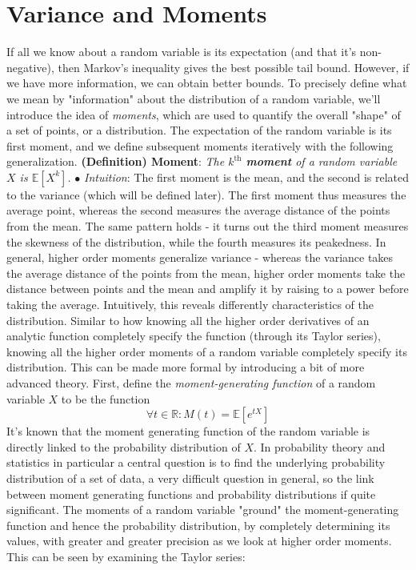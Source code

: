 \documentclass{article}
\newcommand*{\tb}{\textbf}
\newcommand*{\ti}{\textit}
\newcommand*{\n}{\newline}
\newcommand*{\nn}{\newline \newline}
\newcommand*{\In}{\indent \ensuremath{\bullet} \textit{Intuition}: }
\newcommand*{\R}{\mathbb{R}}
\newcommand*{\E}{\mathbb{E}}
\begin{document}
\section{Variance and Moments}
If all we know about a random variable is its expectation (and that it's non-negative), then Markov's inequality gives the best possible tail bound. However, if we have more information, we can obtain better bounds. To precisely define what we mean by "information" about the distribution of a random variable, we'll introduce the idea of \ti{moments}, which are used to quantify the overall "shape" of a set of points, or a distribution. The expectation of the random variable is its first moment, and we define subsequent moments iteratively with the following generalization.
\nn
\tb{(Definition) Moment}: \ti{The $ k^{\text{th}} $ \tb{moment} of a random variable $ X $ is $ \E[X^k] $.}
\n
\In The first moment is the mean, and the second is related to the variance (which will be defined later). The first moment thus measures the average point, whereas the second measures the average distance of the points from the mean. The same pattern holds - it turns out the third moment measures the skewness of the distribution, while the fourth measures its peakedness. In general, higher order moments generalize variance - whereas the variance takes the average distance of the points from the mean, higher order moments take the distance between points and the mean and amplify it by raising to a power before taking the average. Intuitively, this reveals differently characteristics of the distribution. Similar to how knowing all the higher order derivatives of an analytic function completely specify the function (through its Taylor series), knowing all the higher order moments of a random variable completely specify its distribution. This can be made more formal by introducing a bit of more advanced theory. First, define the \ti{moment-generating function} of a random variable $ X $ to be the function
$$ \forall t \in \R: M(t) = \E[e^{t X}] $$
It's known that the moment generating function of the random variable is directly linked to the probability distribution of $ X $. In probability theory and statistics in particular a central question is to find the underlying probability distribution of a set of data, a very difficult question in general, so the link between moment generating functions and probability distributions if quite significant. The moments of a random variable "ground" the moment-generating function and hence the probability distribution, by completely determining its values, with greater and greater precision as we look at higher order moments. This can be seen by examining the Taylor series:
\end{document}
